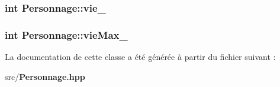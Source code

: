 \subsubsection[{vie\-\_\-}]{\setlength{\rightskip}{0pt plus 5cm}int Personnage\-::vie\-\_\-\hspace{0.3cm}{\ttfamily [private]}}\label{class_personnage_ab73c27e86ff1ad20b8702320f7db36e4}
\subsubsection[{vie\-Max\-\_\-}]{\setlength{\rightskip}{0pt plus 5cm}int Personnage\-::vie\-Max\-\_\-\hspace{0.3cm}{\ttfamily [private]}}\label{class_personnage_aca50034f2dfacb9f575e2bc9802ce283}


La documentation de cette classe a été générée à partir du fichier suivant \-:\begin{DoxyCompactItemize}
\item 
src/{\bf Personnage.\-hpp}\end{DoxyCompactItemize}
